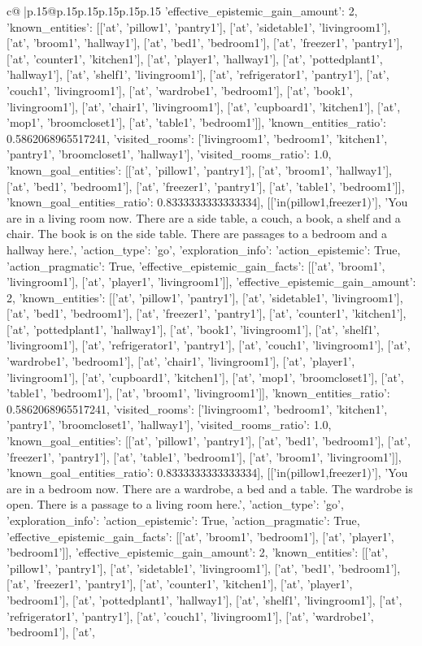 \documentclass{article}
\begin{document}
{\begin{supertabular}{c@{$\;$}|p{.15\linewidth}@{}p{.15\linewidth}p{.15\linewidth}p{.15\linewidth}p{.15\linewidth}p{.15\linewidth}}
{{{'effective_epistemic_gain_amount': 2, 'known_entities': [['at', 'pillow1', 'pantry1'], ['at', 'sidetable1', 'livingroom1'], ['at', 'broom1', 'hallway1'], ['at', 'bed1', 'bedroom1'], ['at', 'freezer1', 'pantry1'], ['at', 'counter1', 'kitchen1'], ['at', 'player1', 'hallway1'], ['at', 'pottedplant1', 'hallway1'], ['at', 'shelf1', 'livingroom1'], ['at', 'refrigerator1', 'pantry1'], ['at', 'couch1', 'livingroom1'], ['at', 'wardrobe1', 'bedroom1'], ['at', 'book1', 'livingroom1'], ['at', 'chair1', 'livingroom1'], ['at', 'cupboard1', 'kitchen1'], ['at', 'mop1', 'broomcloset1'], ['at', 'table1', 'bedroom1']], 'known_entities_ratio': 0.5862068965517241, 'visited_rooms': ['livingroom1', 'bedroom1', 'kitchen1', 'pantry1', 'broomcloset1', 'hallway1'], 'visited_rooms_ratio': 1.0, 'known_goal_entities': [['at', 'pillow1', 'pantry1'], ['at', 'broom1', 'hallway1'], ['at', 'bed1', 'bedroom1'], ['at', 'freezer1', 'pantry1'], ['at', 'table1', 'bedroom1']], 'known_goal_entities_ratio': 0.8333333333333334}}], [['in(pillow1,freezer1)'], 'You are in a living room now. There are a side table, a couch, a book, a shelf and a chair. The book is on the side table. There are passages to a bedroom and a hallway here.', {'action_type': 'go', 'exploration_info': {'action_epistemic': True, 'action_pragmatic': True, 'effective_epistemic_gain_facts': [['at', 'broom1', 'livingroom1'], ['at', 'player1', 'livingroom1']], 'effective_epistemic_gain_amount': 2, 'known_entities': [['at', 'pillow1', 'pantry1'], ['at', 'sidetable1', 'livingroom1'], ['at', 'bed1', 'bedroom1'], ['at', 'freezer1', 'pantry1'], ['at', 'counter1', 'kitchen1'], ['at', 'pottedplant1', 'hallway1'], ['at', 'book1', 'livingroom1'], ['at', 'shelf1', 'livingroom1'], ['at', 'refrigerator1', 'pantry1'], ['at', 'couch1', 'livingroom1'], ['at', 'wardrobe1', 'bedroom1'], ['at', 'chair1', 'livingroom1'], ['at', 'player1', 'livingroom1'], ['at', 'cupboard1', 'kitchen1'], ['at', 'mop1', 'broomcloset1'], ['at', 'table1', 'bedroom1'], ['at', 'broom1', 'livingroom1']], 'known_entities_ratio': 0.5862068965517241, 'visited_rooms': ['livingroom1', 'bedroom1', 'kitchen1', 'pantry1', 'broomcloset1', 'hallway1'], 'visited_rooms_ratio': 1.0, 'known_goal_entities': [['at', 'pillow1', 'pantry1'], ['at', 'bed1', 'bedroom1'], ['at', 'freezer1', 'pantry1'], ['at', 'table1', 'bedroom1'], ['at', 'broom1', 'livingroom1']], 'known_goal_entities_ratio': 0.8333333333333334}}], [['in(pillow1,freezer1)'], 'You are in a bedroom now. There are a wardrobe, a bed and a table. The wardrobe is open. There is a passage to a living room here.', {'action_type': 'go', 'exploration_info': {'action_epistemic': True, 'action_pragmatic': True, 'effective_epistemic_gain_facts': [['at', 'broom1', 'bedroom1'], ['at', 'player1', 'bedroom1']], 'effective_epistemic_gain_amount': 2, 'known_entities': [['at', 'pillow1', 'pantry1'], ['at', 'sidetable1', 'livingroom1'], ['at', 'bed1', 'bedroom1'], ['at', 'freezer1', 'pantry1'], ['at', 'counter1', 'kitchen1'], ['at', 'player1', 'bedroom1'], ['at', 'pottedplant1', 'hallway1'], ['at', 'shelf1', 'livingroom1'], ['at', 'refrigerator1', 'pantry1'], ['at', 'couch1', 'livingroom1'], ['at', 'wardrobe1', 'bedroom1'], ['at', }}}
\end{supertabular}}
\end{document}
